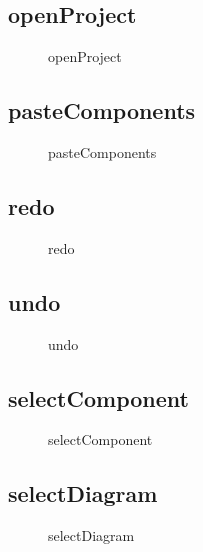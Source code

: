 \documentclass[12pt]{article}
\begin{document}

    \subsection{openProject}
    \begin{figure}[H]
        \centering
        
        \caption{openProject}
    \end{figure}

    \subsection{pasteComponents}
    \begin{figure}[H]
        \centering
        
        \caption{pasteComponents}
    \end{figure}

    \subsection{redo}
    \begin{figure}[H]
        \centering
        
        \caption{redo}
    \end{figure}

    \subsection{undo}
    \begin{figure}[H]
        \centering
        
        \caption{undo}
    \end{figure}


    \subsection{selectComponent}
    \begin{figure}[H]
        \centering
        
        \caption{selectComponent}
    \end{figure}


    \subsection{selectDiagram}
    \begin{figure}[H]
        \centering
        
        \caption{selectDiagram}
    \end{figure}
\end{document}
